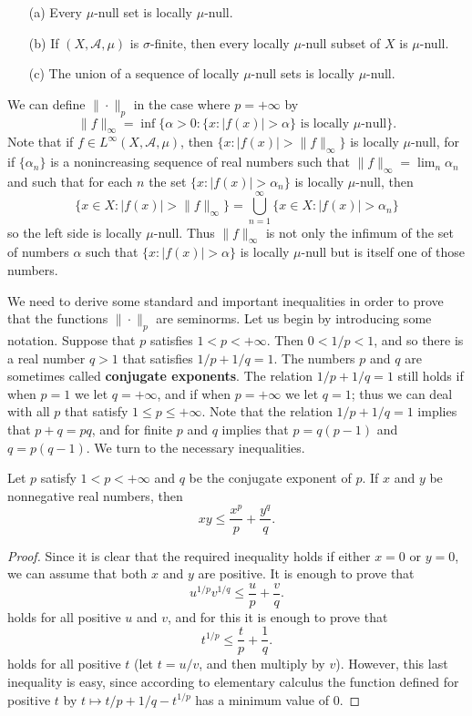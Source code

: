 \begin{itemize}
\item[(a)] Every $\mu$-null set is locally $\mu$-null.
\item[(b)] If $(X,\mathcal{A},\mu)$ is $\sigma$-finite, then every locally $\mu$-null subset of $X$ is $\mu$-null.
\item[(c)] The union of a sequence of locally $\mu$-null sets is locally $\mu$-null.
\end{itemize}
We can define $\|\cdot\|_p$ in the case where $p=+\infty$ by
\[\|f\|_\infty=\inf\{\alpha>0:\text{$\{x:|f(x)|>\alpha\}$ is locally $\mu$-null}\}.\]
Note that if $f\in L^\infty(X,\mathcal{A},\mu)$, then $\{x:|f(x)|>\|f\|_{\infty}\}$ is locally $\mu$-null, for if $\{\alpha_n\}$ is a nonincreasing sequence of real numbers such that $\|f\|_\infty=\lim_n\alpha_n$ and such that for each $n$ the set $\{x:|f(x)|>\alpha_n\}$ is locally $\mu$-null, then
\[\{x\in X:|f(x)|>\|f\|_\infty\}=\bigcup_{n=1}^{\infty}\{x\in X:|f(x)|>\alpha_n\}\]
so the left side is locally $\mu$-null. Thus $\|f\|_\infty$ is not only the infimum of the set of numbers $\alpha$ such that $\{x:|f(x)|>\alpha\}$ is locally $\mu$-null but is itself one of those numbers.\par
We need to derive some standard and important inequalities in order to prove that the functions $\|\cdot\|_p$ are seminorms. Let us begin by introducing some notation. Suppose that $p$ satisfies $1<p<+\infty$. Then $0<1/p<1$, and so there is a real number $q>1$ that satisfies $1/p+1/q=1$. The numbers $p$ and $q$ are sometimes called \textbf{conjugate exponents}. The relation $1/p+1/q=1$ still holds if when $p=1$ we let $q=+\infty$, and if when $p=+\infty$ we let $q=1$; thus we can deal with all $p$ that satisfy $1\leq p\leq+\infty$. Note that the relation $1/p+1/q=1$ implies that $p+q=pq$, and for finite $p$ and $q$ implies that $p=q(p-1)$ and $q=p(q-1)$.
We turn to the necessary inequalities.
\begin{lemma}\label{Holder inequality lemma}
Let $p$ satisfy $1<p<+\infty$ and $q$ be the conjugate exponent of $p$. If $x$ and $y$ be nonnegative real numbers, then
\[xy\leq\frac{x^p}{p}+\frac{y^q}{q}.\]
\end{lemma}
\begin{proof}
Since it is clear that the required inequality holds if either $x=0$ or $y=0$, we can assume that both $x$ and $y$ are positive. It is enough to prove that
\[u^{1/p}v^{1/q}\leq\frac{u}{p}+\frac{v}{q}.\]
holds for all positive $u$ and $v$, and for this it is enough to prove that
\[t^{1/p}\leq\frac{t}{p}+\frac{1}{q}.\]
holds for all positive $t$ (let $t=u/v$, and then multiply by $v$). However, this last inequality is easy, since according to elementary calculus the function defined for positive $t$ by $t\mapsto t/p+1/q-t^{1/p}$ has a minimum value of $0$.
\end{proof}
